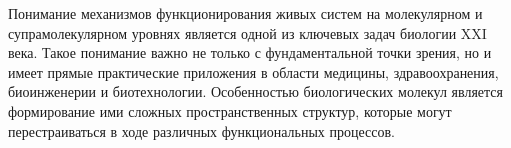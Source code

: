 Понимание механизмов функционирования живых систем на молекулярном и супрамолекулярном уровнях является одной из ключевых задач биологии XXI века. Такое понимание важно не только с фундаментальной точки зрения, но и имеет прямые практические приложения в области медицины, здравоохранения, биоинженерии и биотехнологии. 
Особенностью биологических молекул является формирование ими сложных пространственных структур, которые могут перестраиваться в ходе различных функциональных процессов.
